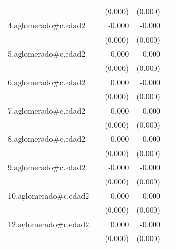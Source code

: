 {\begin{longtable}{l*{4}{D{.}{.}{-1}}}
            &                     &     (0.000)         &     (0.000)         &                     \\
\addlinespace
4.aglomerado#c.edad2&                     &      -0.000         &      -0.000\sym{***}&                     \\
            &                     &     (0.000)         &     (0.000)         &                     \\
\addlinespace
5.aglomerado#c.edad2&                     &      -0.000         &      -0.000         &                     \\
            &                     &     (0.000)         &     (0.000)         &                     \\
\addlinespace
6.aglomerado#c.edad2&                     &       0.000         &      -0.000         &                     \\
            &                     &     (0.000)         &     (0.000)         &                     \\
\addlinespace
7.aglomerado#c.edad2&                     &       0.000         &      -0.000         &                     \\
            &                     &     (0.000)         &     (0.000)         &                     \\
\addlinespace
8.aglomerado#c.edad2&                     &       0.000         &      -0.000         &                     \\
            &                     &     (0.000)         &     (0.000)         &                     \\
\addlinespace
9.aglomerado#c.edad2&                     &      -0.000         &      -0.000\sym{**} &                     \\
            &                     &     (0.000)         &     (0.000)         &                     \\
\addlinespace
10.aglomerado#c.edad2&                     &       0.000         &      -0.000         &                     \\
            &                     &     (0.000)         &     (0.000)         &                     \\
\addlinespace
12.aglomerado#c.edad2&                     &       0.000         &      -0.000         &                     \\
            &                     &     (0.000)         &     (0.000)         &                     \\

\end{longtable}}
